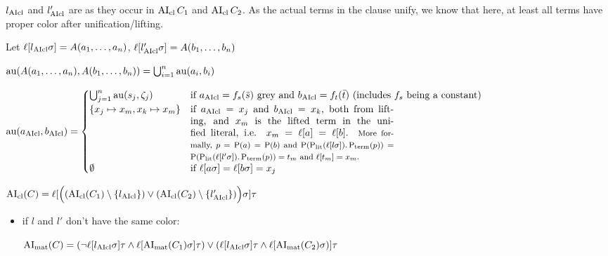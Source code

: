 \documentclass[,%
	paper=a4,%
	DIV12, %
	twoside=false,%
	liststotoc,
	bibtotoc,
	draft=false,%
	numbers=noendperiod
]{scrartcl}
\begin{document}
\begin{enumerate}
		$l_{\operatorname{AIcl}}$ and $l'_{\operatorname{AIcl}}$ are as they occur in $\operatorname{AI}_\mathrm{cl}{C_1}$ and $\operatorname{AI}_\mathrm{cl}{C_2}$. As the actual terms in the clause unify, we know that here, at least all terms have proper color after unification/lifting.

		Let 
		$\ell[l_{\operatorname{AIcl}}\sigma] = A(a_1, \dotsc, a_n)$, $\ell[l_{\operatorname{AIcl}}'\sigma] = A(b_1, \dotsc, b_n)$

		$\operatorname{au}(A(a_1, \dotsc, a_n), A(b_1, \dotsc, b_n)) = \bigcup_{i=1}^n \operatorname{au}(a_i, b_i)$

		$ \aiu (a\fromclause, b\fromclause) =
		\begin{cases}
			\bigcup_{j=1}^n \aiu(s_j, \colterm{j}) & \text{if $a\cl=f_s(\bar s)$ grey and $b\cl = f_t(\bar t)$ (includes $f_s$ being a constant)} \\
			\{x_j \mapsto x_m, x_k \mapsto x_m\} & \parbox[t]{.6\textwidth}{if $a\cl = x_j$ and $b\cl = x_k$, both from lifting, and $x_m$ is the lifted term in the unified literal, i.e. $x_m = \lifboth{a} = \lifboth{b}$.
			{\footnotesize

				More formally, $p = \pos(a) = \pos(b)$ and $\pos(\poslit(\lifboth{l\sigma}).\posterm(p)) = \pos(\poslit(\lifboth{l'\sigma}).\posterm(p)) = t_m$ and $\lifboth{t_m} = x_m$.

		}}\\
				\emptyset & \text{if $\lifboth{a\sigma} = \lifboth{b\sigma} = x_j$ }
			\end{cases} $


		$\operatorname{AI}_\mathrm{cl}(C) =
		\ell[\Big( (\operatorname{AI}_\mathrm{cl}(C_1) \setminus \{l_{\operatorname{AIcl}}\}) \lor (\operatorname{AI}_\mathrm{cl}(C_2)\setminus \{l_{\operatorname{AIcl}}'\}) \Big)\sigma] \tau$ 

		

		\begin{itemize}
			\item if $l$ and $l'$ don't have the same color:

				$\operatorname{AI}_\mathrm{mat}(C) =
				(\lnot {\ell[l\ensuremath{_{\operatorname{AIcl}}}\sigma]\tau} \land \ell[\operatorname{AI}_\mathrm{mat}(C_1)\sigma]\tau) \lor
				(\ell[l_{\operatorname{AIcl}}\sigma]\tau \land \ell[\operatorname{AI}_\mathrm{mat}(C_2)\sigma) ]\tau
				$








\end{itemize}
\end{enumerate}
\end{document}
